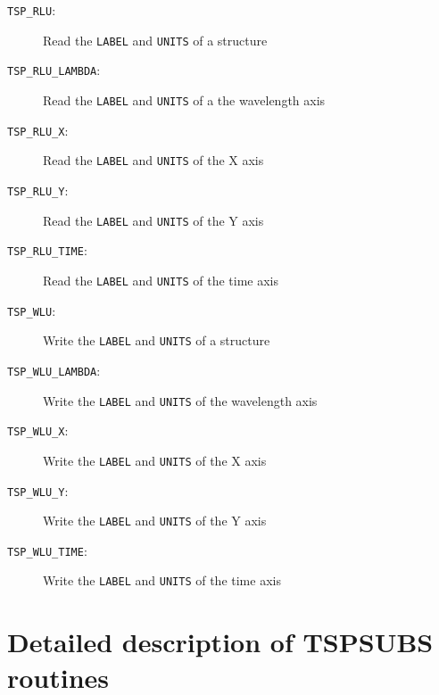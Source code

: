 \documentclass[11pt,twoside,nolof,noabs]{starlink}
\newenvironment{mansectionroutines}{\begin{description}}{\end{description}}
\newcommand{\mansectionitem}[1]{\item[#1:]}
\providecommand{\mantt}[1]{\texttt{#1}}
\begin{document}
\begin{mansectionroutines}
\mansectionitem{{\mantt{TSP\_{}RLU}}}
     Read the {\mantt{LABEL}} and {\mantt{UNITS}} of a structure

\mansectionitem{{\mantt{TSP\_{}RLU\_{}LAMBDA}}}
     Read the {\mantt{LABEL}} and {\mantt{UNITS}} of a the wavelength axis

\mansectionitem{{\mantt{TSP\_{}RLU\_{}X}}}
     Read the {\mantt{LABEL}} and {\mantt{UNITS}} of the X axis

\mansectionitem{{\mantt{TSP\_{}RLU\_{}Y}}}
     Read the {\mantt{LABEL}} and {\mantt{UNITS}} of the Y axis

\mansectionitem{{\mantt{TSP\_{}RLU\_{}TIME}}}
     Read the {\mantt{LABEL}} and {\mantt{UNITS}} of the time axis

\mansectionitem{{\mantt{TSP\_{}WLU}}}
     Write the {\mantt{LABEL}} and {\mantt{UNITS}} of a structure

\mansectionitem{{\mantt{TSP\_{}WLU\_{}LAMBDA}}}
     Write the {\mantt{LABEL}} and {\mantt{UNITS}} of the wavelength axis

\mansectionitem{{\mantt{TSP\_{}WLU\_{}X}}}
     Write the {\mantt{LABEL}} and {\mantt{UNITS}} of the X axis

\mansectionitem{{\mantt{TSP\_{}WLU\_{}Y}}}
     Write the {\mantt{LABEL}} and {\mantt{UNITS}} of the Y axis

\mansectionitem{{\mantt{TSP\_{}WLU\_{}TIME}}}
     Write the {\mantt{LABEL}} and {\mantt{UNITS}} of the time axis

\end{mansectionroutines}


\newpage

\section{Detailed description of TSPSUBS routines}
\end{document}
